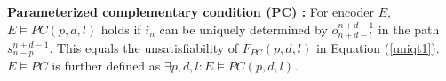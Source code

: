 \documentclass[journal]{IEEEtran}
\begin{document}
%
%
%
%
%

\begin{definition11}\label{def_pcc}%
\textbf{Parameterized complementary condition ($\boldsymbol{PC}$) :}
For encoder $E$,
$E\vDash PC(p,d,l)$ holds if
$i_n$ can be uniquely determined by $o_{n+d-l}^{n+d-1}$ in the path $s_{n-p}^{n+d-1}$.
This equals the unsatisfiability of $F_{PC}(p,d,l)$ in Equation (\ref{uniqt1}).
$E\vDash PC$ is further defined as $\exists p,d,l:E\vDash PC(p,d,l)$.
\end{definition11}
\end{document}
